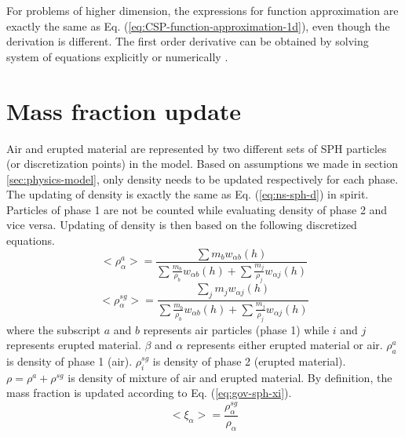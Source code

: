 For problems of higher dimension, the expressions for function approximation are exactly the same as Eq. (\ref{eq:CSP-function-approximation-1d}), even though the derivation is different. The first order derivative can be obtained by solving system of equations explicitly or numerically \citep{chen1999improvement}.

\section{Mass fraction update}
Air and erupted material are represented by two different sets of SPH particles (or discretization points) in the model. Based on assumptions we made in section \ref{sec:physics-model}, only density needs to be updated respectively for each phase. The updating of density is exactly the same as Eq. (\ref{eq:ns-sph-d}) in spirit.  Particles of phase 1 are not be counted while evaluating density of phase 2 and vice versa. Updating of density is then based on the following discretized equations.
\begin{equation}
<\rho_{\alpha}^a>=\frac{\sum m_b w_{\alpha b} \left(h\right)}{\sum \frac{m_b}{\rho_b} w_{\alpha b} \left(h\right) +\sum \frac{m_j}{\rho_j} w_{\alpha j} \left(h\right)} \label{eq:gov-sph-d1}
\end{equation}
\begin{equation}
<\rho_\alpha^{sg}>=\frac{\sum_j m_j w_{\alpha j} \left(h\right)}{\sum \frac{m_b}{\rho_b} w_{\alpha b} \left(h\right) +\sum \frac{m_j}{\rho_j} w_{\alpha j} \left(h\right)} \label{eq:gov-sph-d2}
\end{equation}
where the subscript $a$ and $b$ represents air particles (phase 1) while $i$ and $j$ represents erupted material. $\beta$ and $\alpha$ represents either erupted material or air.
$\rho_a^a$ is density of phase 1 (air). 
 $\rho_i^{sg}$ is density of phase 2 (erupted material).
$\rho=\rho^a + \rho^{sg}$ is density of mixture of air and erupted material. 
By definition, the mass fraction is updated according to Eq. (\ref{eq:gov-sph-xi}).
\begin{equation}
<\xi_{\alpha}> = \dfrac{\rho^{sg}_{\alpha}}{\rho_{\alpha}}
\label{eq:gov-sph-xi}
\end{equation}

